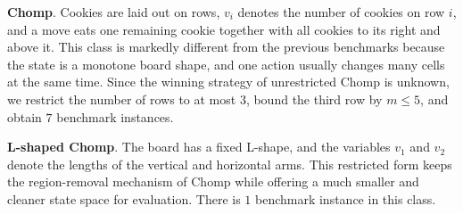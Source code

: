 \documentclass[review]{elsarticle}
\newcommand{\set}[1]{\{ #1 \}}
\newcommand{\tuple}[1]{\langle {#1} \rangle}
\newcommand{\true}{\top}
\newcommand{\statevar}{\mathcal{X}}
\newcommand{\act}{\mathcal{A}}
\newcommand{\constraint}{\mathcal{C}}
\newcommand{\estate}{\mathcal{E}}
\newcommand{\pre}{\mathtt{pre}}
\newcommand{\eff}{\mathtt{eff}}
\begin{document}
{\color{red}\textbf{Chomp}. Cookies are laid out on rows, $v_i$ denotes the number of cookies on row $i$, and a move eats one remaining cookie together with all cookies to its right and above it.}
{\color{red}This class is markedly different from the previous benchmarks because the state is a monotone board shape, and one action usually changes many cells at the same time.}
{\color{red}Since the winning strategy of unrestricted Chomp is unknown, we restrict the number of rows to at most $3$, bound the third row by $m \le 5$, and obtain $7$ benchmark instances.}

{\color{red}\textbf{L-shaped Chomp}. The board has a fixed L-shape, and the variables $v_1$ and $v_2$ denote the lengths of the vertical and horizontal arms.}
{\color{red}This restricted form keeps the region-removal mechanism of Chomp while offering a much smaller and cleaner state space for evaluation.}
{\color{red}There is $1$ benchmark instance in this class.}
\end{document}
